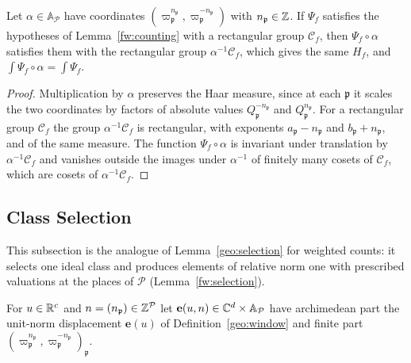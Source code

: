\begin{lemma}\label{fw:rescaling}
Let $\alpha\in\mathbb A_{\mathcal P}$ have coordinates
$(\varpi_{\mathfrak p}^{n_{\mathfrak p}},\varpi_{\mathfrak
p}^{-n_{\mathfrak p}})$ with $n_{\mathfrak p}\in\mathbb Z$. If $\Psi_f$ satisfies the
hypotheses of Lemma~\ref{fw:counting} with a rectangular group $\mathcal
C_f$, then $\Psi_f\circ\alpha$ satisfies them with the rectangular group
$\alpha^{-1}\mathcal C_f$, which gives the same $H_f$, and
$\int\Psi_f\circ\alpha=\int\Psi_f$.
\end{lemma}

\begin{proof}
Multiplication by $\alpha$ preserves the Haar measure, since at each
$\mathfrak p$ it scales the two coordinates by factors of absolute values
$Q_{\mathfrak p}^{-n_{\mathfrak p}}$ and $Q_{\mathfrak p}^{n_{\mathfrak p}}$.
For a rectangular group $\mathcal C_f$ the group $\alpha^{-1}\mathcal C_f$ is
rectangular, with exponents $a_{\mathfrak p}-n_{\mathfrak p}$ and
$b_{\mathfrak p}+n_{\mathfrak p}$, and of the same measure. The function
$\Psi_f\circ\alpha$ is invariant under translation by $\alpha^{-1}\mathcal
C_f$ and vanishes outside the images under $\alpha^{-1}$ of finitely many
cosets of $\mathcal C_f$, which are cosets of $\alpha^{-1}\mathcal C_f$.
\end{proof}

\subsection{Class Selection}

This subsection is the analogue of Lemma~\ref{geo:selection} for weighted
counts: it selects one ideal class and produces elements of relative norm one
with prescribed valuations at the places of $\mathcal P$
(Lemma~\ref{fw:selection}).

For $u\in\mathbb R^c$ and $n=(n_{\mathfrak p})\in\mathbb Z^{\mathcal P}$ let
$\mathbf e(u,n)\in\mathbb C^d\times\mathbb A_{\mathcal P}$ have archimedean part
the unit-norm displacement $\mathbf e(u)$ of Definition~\ref{geo:window} and
finite part $(\varpi_{\mathfrak p}^{n_{\mathfrak
p}},\varpi_{\mathfrak p}^{-n_{\mathfrak p}})_{\mathfrak p}$.

